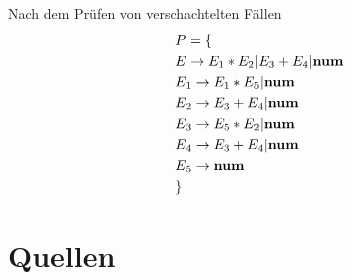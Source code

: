 \documentclass[t]{beamer}
\begin{document}
\begin{frame}
\begin{minipage}[c]{0.4\textwidth}
\begin{block}{Nach dem Prüfen von verschachtelten Fällen}
\begin{align*}
                    & P = \{ \\
                    & E     \rightarrow E_1 * E_2 | E_3 + E_4 | \bold{num} \\
                    & E_1   \rightarrow E_1 * E_5 | \bold{num} \\
                    & E_2   \rightarrow E_3 + E_4 | \bold{num} \\
                    & E_3   \rightarrow E_5 * E_2 | \bold{num} \\
                    & E_4   \rightarrow E_3 + E_4 | \bold{num} \\
                    & E_5   \rightarrow \bold{num} \\
                    & \}
                \end{align*}
            \end{block}
        \end{minipage}
    \end{frame}


    \section{Quellen}
    \begin{frame}[allowframebreaks]
        
        
    \end{frame}
\end{document}
